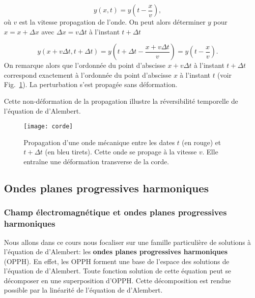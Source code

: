 \begin{equation*}
	y(x, t) = y\left(t - \frac{x}{v}\right),
\end{equation*}
où $v$ est la vitesse propagation de l'onde. On peut alors déterminer $y$ pour
$x = x + \Delta x$ avec $\Delta x = v \Delta t$ à l'instant $t + \Delta t$

\begin{equation*}
	y\left(x + v \Delta t, t + \Delta t\right) = y\left(t + \Delta t - 
	\frac{x + v \Delta t}{v}\right) = y\left(t - \dfrac{x}{v}\right).
\end{equation*}
On remarque alors que l'ordonnée du point d'abscisse $x + v \Delta t$ à l'instant
$t + \Delta t$ correspond exactement à l'ordonnée du point d'abscisse $x$
à l'instant $t$ (voir Fig.~\ref{fig:maxwell_corde}). La perturbation s'est propagée
sans déformation.

\begin{rema}
	Cette non-déformation de la propagation illustre la réversibilité temporelle
	de l'équation de d'Alembert.
\end{rema}

\begin{figure}[htpb]
	\centering
	\texttt{[image: corde]}
	\caption{Propagation d'une onde mécanique entre les dates $t$ (en rouge) et $t
	+ \Delta t$ (en bleu tirets). Cette onde se propage à la vitesse $v$. Elle
	entraîne une déformation transverse de la corde.}%
	\label{fig:maxwell_corde}
\end{figure}

\subsection{Ondes planes progressives harmoniques}
\subsubsection{Champ électromagnétique et ondes planes progressives harmoniques}
Nous allons dans ce cours nous focaliser sur une famille particulière de solutions
à l'équation de d'Alembert: les \textbf{ondes planes progressives harmoniques}
(OPPH). En effet, les OPPH forment une base de l'espace des solutions de l'équation
de d'Alembert. Toute fonction solution de cette équation peut se décomposer en une
superposition d'OPPH. Cette décomposition est rendue possible
par la linéarité de l'équation de d'Alembert.

